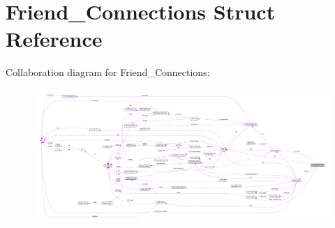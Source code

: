 \hypertarget{struct_friend___connections}{\section{Friend\+\_\+\+Connections Struct Reference}
\label{struct_friend___connections}
}


Collaboration diagram for Friend\+\_\+\+Connections\+:\nopagebreak
\begin{figure}[H]
\begin{center}
\leavevmode
\includegraphics[width=350pt]{struct_friend___connections__coll__graph}
\end{center}
\end{figure}
